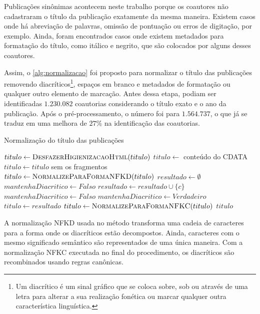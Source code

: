 Publicações sinônimas acontecem neste trabalho porque os coautores não cadastraram o título da publicação exatamente da mesma maneira. Existem casos onde há abreviação de palavras, omissão de pontuação ou erros de digitação, por exemplo. Ainda, foram encontrados casos onde existem metadados para formatação do título, como itálico e negrito, que são colocados por alguns desses coautores.

Assim, o \autoref{alg:normalizacao} foi proposto para normalizar o título das publicações removendo diacríticos\footnote{Um diacrítico é um sinal gráfico que se coloca sobre, sob ou através de uma letra para alterar a sua realização fonética ou marcar qualquer outra característica linguística.}, espaços em branco e metadados de formatação ou qualquer outro elemento de marcação. Antes dessa etapa, podiam ser identificadas $1.230.082$ coautorias considerando o título exato e o ano da publicação. Após o pré-processamento, o número foi para $1.564.737$, o que já se traduz em uma melhora de $27$\% na identificação das coautorias.

\begin{algorithm}
\caption{Normalização do título das publicações}
\label{alg:normalizacao}
\begin{algorithmic}[1]
    \State $titulo \gets \Call{DesfazerHigienizacaoHtml}{titulo}$ 
        \State $titulo \gets$ conteúdo do CDATA 
    \EndIf
        \State $titulo \gets titulo$ sem os fragmentos  
    \EndIf
    \State $titulo \gets \Call{NormalizeParaFormaNFKD}{titulo}$
    \State $resultado \gets \emptyset$
    \State $mantenhaDiacritico \gets Falso$
            \State $resultado \gets resultado \cup \{c\}$
                \State $mantenhaDiacritico \gets Falso$
            \Else
                \State $mantenhaDiacritico \gets Verdadeiro$
            \EndIf
        \EndIf
    \EndFor
    \State $titulo\gets resultado$
    \State $titulo\gets \Call{NormalizeParaFormaNFKC}{titulo}$
    \State \Return $titulo$
\EndProcedure
\end{algorithmic}
\end{algorithm}

A normalização NFKD usada no método transforma uma cadeia de caracteres para a forma onde os diacríticos estão decompostos. Ainda, caracteres com o mesmo significado semântico são representados de uma única maneira. Com a normalização NFKC executada no final do procedimento, os diacríticos são recombinados usando regras canônicas.

